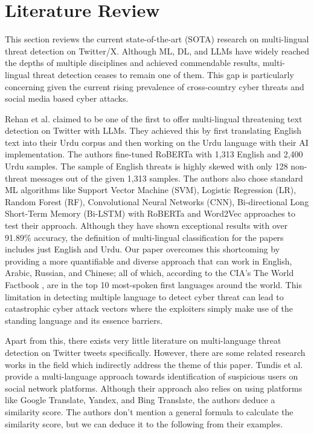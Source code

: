 \section{Literature Review}
\label{literature}

This section reviews the current state-of-the-art (SOTA) research on multi-lingual threat detection on Twitter/X. Although ML, DL, and LLMs have widely reached the depths of multiple disciplines and achieved commendable results, multi-lingual threat detection ceases to remain one of them. This gap is particularly concerning given the current rising prevalence of cross-country cyber threats and social media based cyber attacks.

Rehan et al. \cite{english-urdu} claimed to be one of the first to offer multi-lingual threatening text detection on Twitter with LLMs. They achieved this by first translating English text into their Urdu corpus and then working on the Urdu language with their AI implementation. The authors fine-tuned RoBERTa with 1,313 English and 2,400 Urdu samples. The sample of English threats is highly skewed with only 128 non-threat messages out of the given 1,313 samples. The authors also chose standard ML algorithms like Support Vector Machine (SVM), Logistic Regression (LR), Random Forest (RF), Convolutional Neural Networks (CNN), Bi-directional Long Short-Term Memory (Bi-LSTM) with RoBERTa and Word2Vec approaches to test their approach. Although they have shown exceptional results with over 91.89\% accuracy, the definition of multi-lingual classification for the papers includes just English and Urdu. Our paper overcomes this shortcoming by providing a more quantifiable and diverse approach that can work in English, Arabic, Russian, and Chinese; all of which, according to the CIA's The World Factbook \cite{cia_factbook}, are in the top 10 most-spoken first languages around the world. This limitation in detecting multiple language to detect cyber threat can lead to catastrophic cyber attack vectors where the exploiters simply make use of the standing language and its essence barriers.

Apart from this, there exists very little literature on multi-language threat detection on Twitter tweets specifically. However, there are some related research works in the field which indirectly address the theme of this paper. Tundis et al. \cite{berlin_bomb} provide a multi-language approach towards identification of suspicious users on social network platforms. Although their approach also relies on using platforms like Google Translate, Yandex, and Bing Translate, the authors deduce a similarity score. The authors don't mention a general formula to calculate the similarity score, but we can deduce it to the following from their examples.


